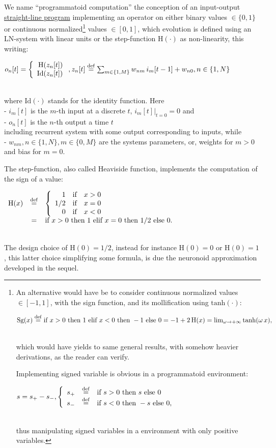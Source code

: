 \documentclass[a4]{article} \usepackage[left=2cm,right=3cm,top=1cm,bottom=2cm]{geometry}
\newcommand{\eqline}[1]{~\vspace{0.1cm}\\\centerline{$#1$}\vspace{0.1cm}\\}
\newcommand{\defq}{\stackrel {\rm def}{=}}
\newcommand{\tab}{\hphantom{4mm}}
\begin{document}
We name ``programmatoid computation'' the conception of an input-output \href{https://en.wikipedia.org/wiki/Straight-line_program}{straight-line program} implementing an operator on either binary values $\in \{0, 1\}$ or continuous normalized\footnote{An alternative would have be to consider continuous normalized values $\in [-1, 1]$, with the sign function, and its mollification using $\mbox{tanh}(\cdot)$:
\eqline{\mbox{Sg}(x) \defq \mbox{if } x > 0 \mbox{ then } 1 \mbox{ elif } x < 0 \mbox{ then } -1 \mbox{ else } 0 = -1 + 2 \, \mbox{H}(x) = \lim_{\omega \rightarrow +\infty} \mbox{tanh}(\omega \, x),}
which would have yields to same general results, with somehow heavier derivations, as the reader can verify.

Implementing signed variable is obvious in a programmatoid environment:
\eqline{s = s_+ - s_-, \left\{\begin{array}{rcl} s_+ &\defq& \mbox{if } s  > 0 \mbox{ then } s \mbox{ else } 0 \\ s_- &\defq& \mbox{if } s  < 0 \mbox{ then } -s \mbox{ else } 0, \\ \end{array} \right.}
thus manipulating signed variables in a environment with only positive variables.} values $\in [0, 1]$, which evolution is defined using an LN-system with linear units or the step-function $\mbox{H}(\cdot)$ as non-linearity, this writing:
\eqline{o_n[t] = \left\{ \begin{array}{r} \mbox{H}(z_n[t]) \\ \mbox{Id}(z_n[t]) \\ \end{array} \right., z_n[t] \defq \sum_{m\in\{1,M\}} w_{nm} \, i_m[t-1] + w_{n0}, n \in \{1, N\}}
where $\mbox{Id}(\cdot)$ stands for the identity function. Here
\\\tab - $i_m[t]$ is the $m$-th input at a discrete $t$, $\left. i_m[t] \right|_{t=0} = 0$ and
\\\tab - $o_n[t]$ is the $n$-th output a time $t$
\\ including recurrent system with some output corresponding to inputs, while
\\\tab - $w_{nm}, n \in \{1, N\}, m \in \{ 0, M \}$ are the systems parameters, or, weights for $m > 0$ and bias for $m = 0$.

The step-function, also called Heaviside function, implements the computation of the sign of a value:
\eqline{\begin{array}{rcl}
    \mbox{H}(x) &\defq& \left\{ \begin{array}{rcl} 1 &\mbox{if}& x > 0\\ 1/2 &\mbox{if}& x = 0\\ 0 &\mbox{if}& x < 0\\ \end{array}\right. \\
    &=& \mbox{if } x > 0 \mbox{ then } 1 \mbox{ elif } x = 0 \mbox{ then } 1/2 \mbox{ else } 0. \\
\end{array}}
The design choice of $\mbox{H}(0) = 1/2$, instead for instance $\mbox{H}(0)=0$ or $\mbox{H}(0)=1$, this latter choice simplifying some formula, is due the neuronoid approximation developed in the sequel.
\end{document}
